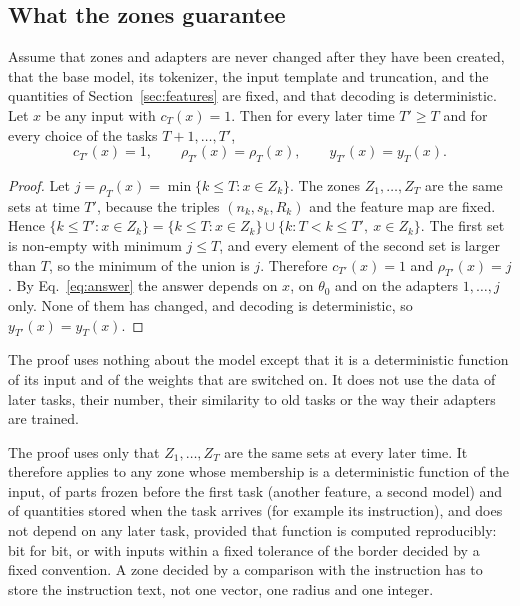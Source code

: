 \subsection{What the zones guarantee}
\label{sec:guarantee}

\begin{theorem}
\label{thm:writeonce}
Assume that zones and adapters are never changed after they have been created, that the base model, its tokenizer, the input template and truncation, and the quantities of Section~\ref{sec:features} are fixed, and that decoding is deterministic. Let
$x$ be any input with $c_T(x) = 1$. Then for every later time $T' \ge T$ and for every choice of the
tasks $T+1, \dots, T'$,
\[
  c_{T'}(x) = 1, \qquad \rho_{T'}(x) = \rho_T(x), \qquad y_{T'}(x) = y_T(x) .
\]
\end{theorem}

\begin{proof}
Let $j = \rho_T(x) = \min\{k \le T : x \in Z_k\}$. The zones $Z_1, \dots, Z_T$ are the same sets at
time $T'$, because the triples $(n_k, s_k, R_k)$ and the feature map are fixed. Hence
$\{k \le T' : x \in Z_k\} = \{k \le T : x \in Z_k\} \cup \{k : T < k \le T',\ x \in Z_k\}$. The first
set is non-empty with minimum $j \le T$, and every element of the second set is larger than $T$, so
the minimum of the union is $j$. Therefore $c_{T'}(x) = 1$ and $\rho_{T'}(x) = j$. By
Eq.~\eqref{eq:answer} the answer depends on $x$, on $\theta_0$ and on the adapters $1, \dots, j$
only. None of them has changed, and decoding is deterministic, so $y_{T'}(x) = y_T(x)$.
\end{proof}

The proof uses nothing about the model except that it is a deterministic function of its input and
of the weights that are switched on. It does not use the data of later tasks, their number, their
similarity to old tasks or the way their adapters are trained.

\begin{remark}
\label{rem:otherzones}
The proof uses only that $Z_1,\dots,Z_T$ are the same sets at every later time. It therefore applies to any zone whose membership is a
deterministic function of the input, of parts frozen before the first task (another feature, a second model) and of quantities stored when the task arrives
(for example its instruction), and does not depend on any later task, provided that function is computed reproducibly: bit for bit, or with inputs within a fixed tolerance of the border decided by a fixed convention.
A zone decided by a comparison with the instruction has to store the instruction text, not one vector, one radius and one integer.
\end{remark}


